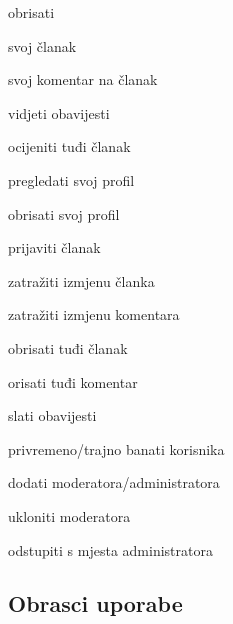 \begin{packed_enum}
\begin{packed_enum}
    \item obrisati

        \begin{packed_enum}

        \item svoj članak
        \item svoj komentar na članak

        \end{packed_enum}

    \item vidjeti obavijesti
    \item ocijeniti tuđi članak
    \item pregledati svoj profil
    \item obrisati svoj profil
    \item prijaviti članak

    \end{packed_enum}

\item {}

    \begin{packed_enum}

    \item zatražiti izmjenu članka
    \item zatražiti izmjenu komentara
    \item obrisati tuđi članak
    \item orisati tuđi komentar
    \item slati obavijesti
    \item privremeno/trajno banati korisnika

    \end{packed_enum}

\item {}

    \begin{packed_enum}

    \item dodati moderatora/administratora
    \item ukloniti moderatora
    \item odstupiti s mjesta administratora

    \end{packed_enum}

\end{packed_enum}

\eject 

\subsection{Obrasci uporabe}


